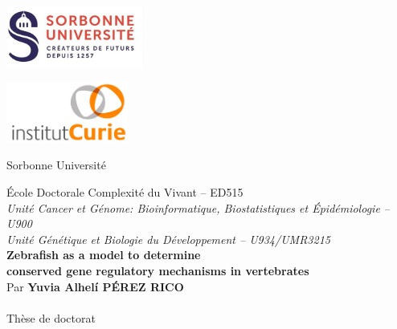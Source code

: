 \documentclass[a4paper,11pt,twoside]{book}
\begin{document}
	\frontmatter

	\begin{titlepage}
		\begin{minipage}[t]{0.49\textwidth}
			\begin{flushleft}
				\includegraphics[width=45mm,height=20mm]{./figures/Sorbonne_logo2.jpg}
			\end{flushleft}
		\end{minipage}
		\hspace{28mm}
		\begin{minipage}[t]{0.25\textwidth}
			\begin{flushright}
				\includegraphics[width=40mm,height=20mm]{./figures/institut-curie.jpg}
			\end{flushright}
		\end{minipage}
		\hfill
		\vspace{10mm}
		\begingroup
		    \fontsize{20pt}{12pt}\selectfont
			\begin{center}
				Sorbonne Universit\'e\\[1cm]
			\end{center}
		\endgroup
		\begingroup
		    \fontsize{12pt}{12pt}\selectfont
			\begin{center}
				\'Ecole Doctorale Complexit\'e du Vivant -- ED515\\[5mm]
				\textit{Unit\'e Cancer et G\'enome: Bioinformatique, Biostatistiques et \'Epid\'emiologie -- U900}\\[2mm]
				\textit{Unit\'e G\'en\'etique et Biologie du D\'eveloppement -- U934/UMR3215}\\[3.5cm]
		\begingroup
		    \fontsize{16pt}{16pt}\selectfont				
				\textbf{Zebrafish as a model to determine\\ conserved gene regulatory mechanisms in vertebrates}\\[3.5cm]
		\endgroup
				Par \textbf{Yuvia Alhel\'i P\'EREZ RICO}\\~\\
				Th\`ese de doctorat\\[2cm]

\end{center}
\end{titlepage}
\end{document}
